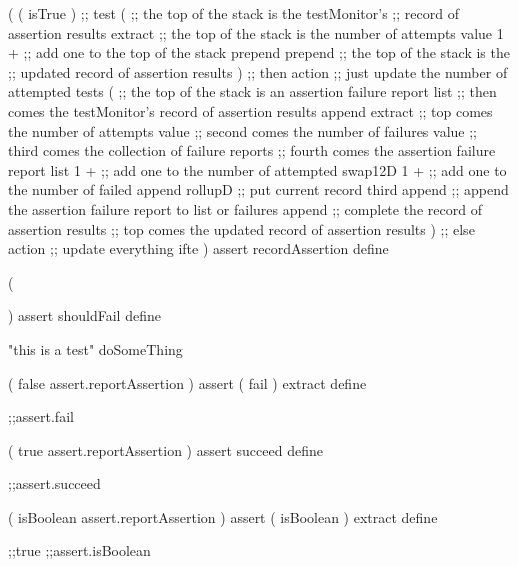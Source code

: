 \startJoylolCode
(
  (
    isTrue
  )  ;; test
  (
    ;; the top of the stack is the testMonitor's
    ;; record of assertion results
    extract
    ;; the top of the stack is the number of attempts value
    1 + ;; add one to the top of the stack
    prepend
    prepend
    ;; the top of the stack is the
    ;; updated record of assertion results
  )  ;; then action ;; just update the number of attempted tests 
  (
    ;; the top of the stack is an assertion failure report list
    ;; then comes the testMonitor's record of assertion results
    append
    extract
    ;; top    comes the number of attempts value
    ;; second comes the number of failures value
    ;; third  comes the collection of failure reports
    ;; fourth comes the assertion failure report list
    1 + ;; add one to the number of attempted
    swap12D
    1 + ;; add one to the number of failed
    append
    rollupD ;; put current record third
    append  ;; append the assertion failure report to list or failures
    append  ;; complete the record of assertion results
    ;; top comes the updated record of assertion results
  )  ;; else action ;; update everything
  ifte
)
assert
recordAssertion
define
\stopJoylolCode
\stopTestSuite

\startTestSuite[assertShouldFail]

\startJoylolCode

(
  
)
assert
shouldFail
define
\stopJoylolCode

\startJoylolTest
"this is a test"
doSomeThing
\stopJoylolTest
\stopTestCase
\stopTestSuite

\startTestSuite[assertFail]

\startJoylolCode
(
  false
  assert.reportAssertion
)
assert
( fail ) extract
define
\stopJoylolCode

\startJoylolTest
  ;;assert.fail
\stopJoylolTest
\stopTestCase
\stopTestSuite

\startTestSuite[assertSucceed]
\startJoylolCode
(
  true
  assert.reportAssertion
)
assert
succeed
define
\stopJoylolCode

\startJoylolTest
  ;;assert.succeed
\stopJoylolTest
\stopTestCase
\stopTestSuite

\startJoylolCode
(
  isBoolean
  assert.reportAssertion
)
assert
( isBoolean ) extract
define
\stopJoylolCode

\startJoylolTest
  ;;true
  ;;assert.isBoolean
\stopJoylolTest
\stopTestCase

